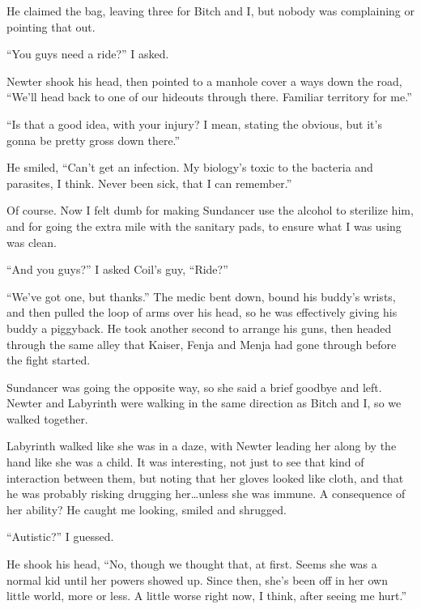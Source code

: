 He claimed the bag, leaving three for Bitch and I, but nobody was complaining or pointing that out.



``You guys need a ride?'' I asked.



Newter shook his head, then pointed to a manhole cover a ways down the road, ``We'll head back to one of our hideouts through there.  Familiar territory for me.''



``Is that a good idea, with your injury?  I mean, stating the obvious, but it's gonna be pretty gross down there.''



He smiled, ``Can't get an infection.  My biology's toxic to the bacteria and parasites, I think.  Never been sick, that I can remember.''



Of course.  Now I felt dumb for making Sundancer use the alcohol to sterilize him, and for going the extra mile with the sanitary pads, to ensure what I was using was clean.



``And you guys?'' I asked Coil's guy, ``Ride?''



``We've got one, but thanks.''  The medic bent down, bound his buddy's wrists, and then pulled the loop of arms over his head, so he was effectively giving his buddy a piggyback.  He took another second to arrange his guns, then headed through the same alley that Kaiser, Fenja and Menja had gone through before the fight started.



Sundancer was going the opposite way, so she said a brief goodbye and left.  Newter and Labyrinth were walking in the same direction as Bitch and I, so we walked together.



Labyrinth walked like she was in a daze, with Newter leading her along by the hand like she was a child.  It was interesting, not just to see that kind of interaction between them, but noting that her gloves looked like cloth, and that he was probably risking drugging her\ldots unless she was immune.  A consequence of her ability?  He caught me looking, smiled and shrugged.



``Autistic?'' I guessed.



He shook his head, ``No, though we thought that, at first.  Seems she was a normal kid until her powers showed up.  Since then, she's been off in her own little world, more or less.  A little worse right now, I think, after seeing me hurt.''



